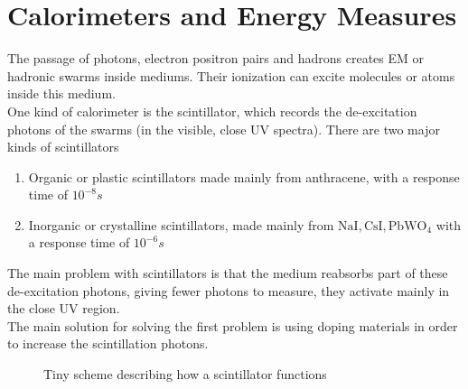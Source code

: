 \documentclass[../qm.tex]{subfiles}
\begin{document}
\section{Calorimeters and Energy Measures}
The passage of photons, electron positron pairs and hadrons creates EM or hadronic swarms inside mediums. Their ionization can excite molecules or atoms inside this medium.\\
One kind of calorimeter is the scintillator, which records the de-excitation photons of the swarms (in the visible, close UV spectra). There are two major kinds of scintillators
\begin{enumerate}
\item Organic or plastic scintillators made mainly from anthracene, with a response time of $10^{-8}\unit{s}$
\item Inorganic or crystalline scintillators, made mainly from $\mathrm{NaI, CsI, PbWO_4}$ with a response time of $10^{-6}\unit{s}$
\end{enumerate}
The main problem with scintillators is that the medium reabsorbs part of these de-excitation photons, giving fewer photons to measure, they activate mainly in the close UV region.\\
The main solution for solving the first problem is using doping materials in order to increase the scintillation photons.\\
\begin{figure}[H]
	\centering
	\caption{Tiny scheme describing how a scintillator functions}
	\label{fig:scintillator}
\end{figure}
\end{document}
